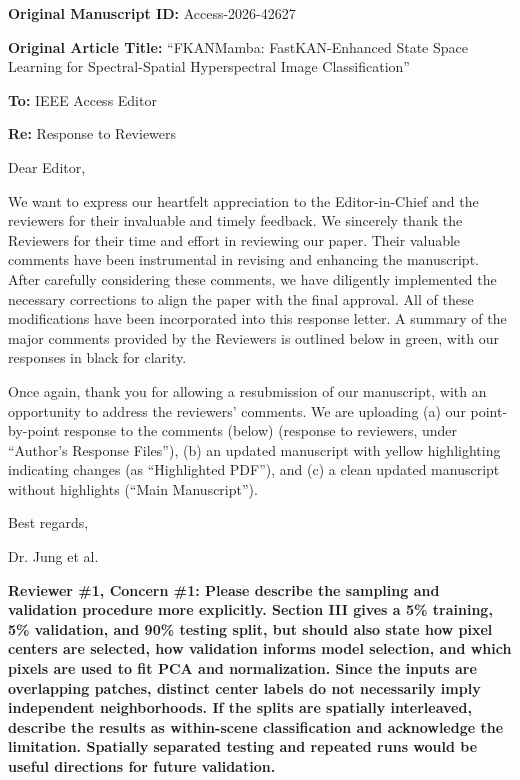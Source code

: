 \documentclass[a4paper,onecolumn,11pt]{IEEEtran}
\begin{document}
\noindent \textbf{Original Manuscript ID:} Access-2026-42627

\vspace{0.5em}

\noindent \textbf{Original Article Title:} ``FKANMamba: FastKAN-Enhanced State Space Learning for Spectral-Spatial Hyperspectral Image Classification''

\vspace{2em}

\noindent \textbf{To:} IEEE Access Editor

\noindent \textbf{Re:} Response to Reviewers

\vspace{2em}

Dear Editor,

\vspace{1em}
We want to express our heartfelt appreciation to the Editor-in-Chief and the reviewers for their invaluable and timely feedback. We sincerely thank the Reviewers for their time and effort in reviewing our paper. Their valuable comments have been instrumental in revising and enhancing the manuscript. After carefully considering these comments, we have diligently implemented the necessary corrections to align the paper with the final approval. All of these modifications have been incorporated into this response letter. A summary of the major comments provided by the Reviewers is outlined below in green, with our responses in black for clarity.

Once again, thank you for allowing a resubmission of our manuscript, with an opportunity to address the reviewers’ comments. We are uploading (a) our point-by-point response to the comments (below) (response to reviewers, under ``Author’s Response Files''), (b) an updated manuscript with yellow highlighting indicating changes (as ``Highlighted PDF''), and (c) a clean updated manuscript without highlights (``Main Manuscript'').

\vspace{2em}

Best regards,

Dr. Jung et al.

\newpage

{\color{reviewgreen}\textbf{Reviewer \#1, Concern \#1: Please describe the sampling and validation procedure more explicitly. Section III gives a 5\% training, 5\% validation, and 90\% testing split, but should also state how pixel centers are selected, how validation informs model selection, and which pixels are used to fit PCA and normalization. Since the inputs are overlapping patches, distinct center labels do not necessarily imply independent neighborhoods. If the splits are spatially interleaved, describe the results as within-scene classification and acknowledge the limitation. Spatially separated testing and repeated runs would be useful directions for future validation.
}}
\end{document}
